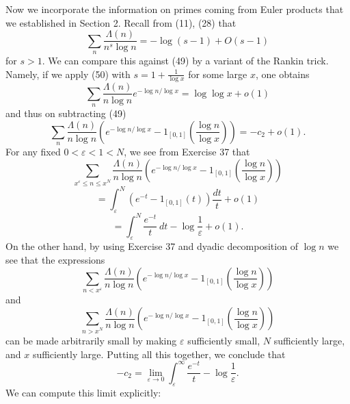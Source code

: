 \documentclass[10pt,reqno]{amsart}
\begin{document}
Now we incorporate the information on primes coming from Euler products that we established in Section 2. Recall from (11), (28) that
%
\begin{equation}   \sum_n \frac{\Lambda(n)}{n^s \log n} = -\log(s-1) + O(s-1) \end{equation}
%
for $s>1$. We can compare this against (49) by a variant of the Rankin trick. Namely, if we apply (50) with $s = 1 + \frac{1}{\log x}$ for some large $x$, one obtains
%
\[  \sum_n \frac{\Lambda(n)}{n \log n} e^{-\log n / \log x} = \log \log x + o(1) \]
%
and thus on subtracting (49)
%
\[  \sum_n \frac{\Lambda(n)}{n \log n} \left( e^{-\log n / \log x} - 1_{[0,1]} \left(\frac{\log n}{\log x} \right) \right) = - c_2 + o(1). \]
%
For any fixed $0 < \varepsilon < 1 < N$, we see from Exercise 37 that
%
\[  \sum_{x^\varepsilon \leq n \leq x^N} \frac{\Lambda(n)}{n \log n} ( e^{-\log n / \log x} - 1_{[0,1]}(\frac{\log n}{\log x})) \]
%
\[ = \int_\varepsilon^N (e^{-t} - 1_{[0,1]}(t)) \frac{dt}{t} + o(1) \]
%
\[  = \int_\varepsilon^N \frac{e^{-t}}{t}\ dt - \log \frac{1}{\varepsilon} + o(1). \]
%
On the other hand, by using Exercise 37 and dyadic decomposition of $\log n$ we see that the expressions
%
\[ \sum_{n < x^\varepsilon} \frac{\Lambda(n)}{n \log n} \left( e^{-\log n / \log x} - 1_{[0,1]} \left(\frac{\log n}{\log x} \right) \right) \]
%
and
%
\[ \sum_{n > x^N} \frac{\Lambda(n)}{n \log n} ( e^{-\log n / \log x} - 1_{[0,1]}(\frac{\log n}{\log x})) \]
%
can be made arbitrarily small by making $\varepsilon$ sufficiently small, $N$ sufficiently large, and $x$ sufficiently large. Putting all this together, we conclude that
%
\[  -c_2 = \lim_{\varepsilon \rightarrow 0} \int_\varepsilon^\infty \frac{e^{-t}}{t} - \log \frac{1}{\varepsilon}.\]
%
We can compute this limit explicitly:
\end{document}
